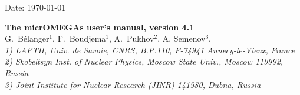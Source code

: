 \documentclass[12pt,a4paper]{article}
\begin{document}
\def\micro{{\tt micrOMEGAs}}
\def\ra{\rightarrow}
\def\calchep{{\tt CalcHEP}}

\def\suspect{{\tt SuSpect}}
\def\mbmb{m_b(m_b)}
\def\mt{m_t}
\def\dMb{\Delta m_b}
\def\dMq{\Delta m_q}
\def\delrho{\Delta\rho}
\def\bsgamma{b\to s\gamma}
\def\bsmu{B_s\to \mu^+\mu^-}
\def\gmuon{(g-2)_\mu}
\def\noi{\noindent}
\def\VERSION{4.2}
\def\neuto{\tilde\chi^0_1}
\def\neuti{\tilde\chi^0_i}
\def\neutt{\tilde\chi^0_2}
\def\neuth{\tilde\chi^0_3}
\def\smodels{{\tt SModelS}}
\def\eg{{\it e.g.}}


\def\wimpsim{{\tt WimpSim\;}}
\def\pppc{{\tt }PPPC4DM$\nu$\;}
\newcommand{\gb}{\color{blue}}

\begin{flushright}
   \vspace*{-18mm}
   Date: \today
\end{flushright}
\vspace*{2mm}




\begin{center}


{\Large\bf The  micrOMEGAs user's manual, version 4.1} \\[8mm]

{\large   G.~B\'elanger$^1$, F.~Boudjema$^1$, A.~Pukhov$^2$,  A. Semenov$^3$.}\\[4mm]

{\it 1) LAPTH, Univ. de Savoie, CNRS, B.P.110,  F-74941 Annecy-le-Vieux, France\\
     2) Skobeltsyn Inst. of Nuclear Physics, Moscow State Univ., Moscow 119992, Russia\\
     3) Joint Institute for Nuclear Research (JINR) 141980, Dubna,  Russia\\}
\end{center}

\begin{abstract}
We give an up-to-date description of the micrOMEGAs functions. Only the routines which are available for
the users are described.  Examples on how to use these functions
can be found in the sample main programs distributed with the code. 
\end{abstract}



\tableofcontents

\newpage
\end{document}
